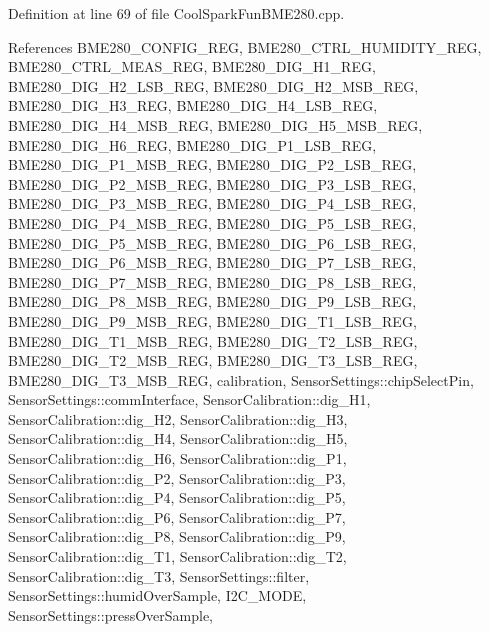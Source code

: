 Definition at line 69 of file Cool\+Spark\+Fun\+B\+M\+E280.\+cpp.



References B\+M\+E280\+\_\+\+C\+O\+N\+F\+I\+G\+\_\+\+R\+EG, B\+M\+E280\+\_\+\+C\+T\+R\+L\+\_\+\+H\+U\+M\+I\+D\+I\+T\+Y\+\_\+\+R\+EG, B\+M\+E280\+\_\+\+C\+T\+R\+L\+\_\+\+M\+E\+A\+S\+\_\+\+R\+EG, B\+M\+E280\+\_\+\+D\+I\+G\+\_\+\+H1\+\_\+\+R\+EG, B\+M\+E280\+\_\+\+D\+I\+G\+\_\+\+H2\+\_\+\+L\+S\+B\+\_\+\+R\+EG, B\+M\+E280\+\_\+\+D\+I\+G\+\_\+\+H2\+\_\+\+M\+S\+B\+\_\+\+R\+EG, B\+M\+E280\+\_\+\+D\+I\+G\+\_\+\+H3\+\_\+\+R\+EG, B\+M\+E280\+\_\+\+D\+I\+G\+\_\+\+H4\+\_\+\+L\+S\+B\+\_\+\+R\+EG, B\+M\+E280\+\_\+\+D\+I\+G\+\_\+\+H4\+\_\+\+M\+S\+B\+\_\+\+R\+EG, B\+M\+E280\+\_\+\+D\+I\+G\+\_\+\+H5\+\_\+\+M\+S\+B\+\_\+\+R\+EG, B\+M\+E280\+\_\+\+D\+I\+G\+\_\+\+H6\+\_\+\+R\+EG, B\+M\+E280\+\_\+\+D\+I\+G\+\_\+\+P1\+\_\+\+L\+S\+B\+\_\+\+R\+EG, B\+M\+E280\+\_\+\+D\+I\+G\+\_\+\+P1\+\_\+\+M\+S\+B\+\_\+\+R\+EG, B\+M\+E280\+\_\+\+D\+I\+G\+\_\+\+P2\+\_\+\+L\+S\+B\+\_\+\+R\+EG, B\+M\+E280\+\_\+\+D\+I\+G\+\_\+\+P2\+\_\+\+M\+S\+B\+\_\+\+R\+EG, B\+M\+E280\+\_\+\+D\+I\+G\+\_\+\+P3\+\_\+\+L\+S\+B\+\_\+\+R\+EG, B\+M\+E280\+\_\+\+D\+I\+G\+\_\+\+P3\+\_\+\+M\+S\+B\+\_\+\+R\+EG, B\+M\+E280\+\_\+\+D\+I\+G\+\_\+\+P4\+\_\+\+L\+S\+B\+\_\+\+R\+EG, B\+M\+E280\+\_\+\+D\+I\+G\+\_\+\+P4\+\_\+\+M\+S\+B\+\_\+\+R\+EG, B\+M\+E280\+\_\+\+D\+I\+G\+\_\+\+P5\+\_\+\+L\+S\+B\+\_\+\+R\+EG, B\+M\+E280\+\_\+\+D\+I\+G\+\_\+\+P5\+\_\+\+M\+S\+B\+\_\+\+R\+EG, B\+M\+E280\+\_\+\+D\+I\+G\+\_\+\+P6\+\_\+\+L\+S\+B\+\_\+\+R\+EG, B\+M\+E280\+\_\+\+D\+I\+G\+\_\+\+P6\+\_\+\+M\+S\+B\+\_\+\+R\+EG, B\+M\+E280\+\_\+\+D\+I\+G\+\_\+\+P7\+\_\+\+L\+S\+B\+\_\+\+R\+EG, B\+M\+E280\+\_\+\+D\+I\+G\+\_\+\+P7\+\_\+\+M\+S\+B\+\_\+\+R\+EG, B\+M\+E280\+\_\+\+D\+I\+G\+\_\+\+P8\+\_\+\+L\+S\+B\+\_\+\+R\+EG, B\+M\+E280\+\_\+\+D\+I\+G\+\_\+\+P8\+\_\+\+M\+S\+B\+\_\+\+R\+EG, B\+M\+E280\+\_\+\+D\+I\+G\+\_\+\+P9\+\_\+\+L\+S\+B\+\_\+\+R\+EG, B\+M\+E280\+\_\+\+D\+I\+G\+\_\+\+P9\+\_\+\+M\+S\+B\+\_\+\+R\+EG, B\+M\+E280\+\_\+\+D\+I\+G\+\_\+\+T1\+\_\+\+L\+S\+B\+\_\+\+R\+EG, B\+M\+E280\+\_\+\+D\+I\+G\+\_\+\+T1\+\_\+\+M\+S\+B\+\_\+\+R\+EG, B\+M\+E280\+\_\+\+D\+I\+G\+\_\+\+T2\+\_\+\+L\+S\+B\+\_\+\+R\+EG, B\+M\+E280\+\_\+\+D\+I\+G\+\_\+\+T2\+\_\+\+M\+S\+B\+\_\+\+R\+EG, B\+M\+E280\+\_\+\+D\+I\+G\+\_\+\+T3\+\_\+\+L\+S\+B\+\_\+\+R\+EG, B\+M\+E280\+\_\+\+D\+I\+G\+\_\+\+T3\+\_\+\+M\+S\+B\+\_\+\+R\+EG, calibration, Sensor\+Settings\+::chip\+Select\+Pin, Sensor\+Settings\+::comm\+Interface, Sensor\+Calibration\+::dig\+\_\+\+H1, Sensor\+Calibration\+::dig\+\_\+\+H2, Sensor\+Calibration\+::dig\+\_\+\+H3, Sensor\+Calibration\+::dig\+\_\+\+H4, Sensor\+Calibration\+::dig\+\_\+\+H5, Sensor\+Calibration\+::dig\+\_\+\+H6, Sensor\+Calibration\+::dig\+\_\+\+P1, Sensor\+Calibration\+::dig\+\_\+\+P2, Sensor\+Calibration\+::dig\+\_\+\+P3, Sensor\+Calibration\+::dig\+\_\+\+P4, Sensor\+Calibration\+::dig\+\_\+\+P5, Sensor\+Calibration\+::dig\+\_\+\+P6, Sensor\+Calibration\+::dig\+\_\+\+P7, Sensor\+Calibration\+::dig\+\_\+\+P8, Sensor\+Calibration\+::dig\+\_\+\+P9, Sensor\+Calibration\+::dig\+\_\+\+T1, Sensor\+Calibration\+::dig\+\_\+\+T2, Sensor\+Calibration\+::dig\+\_\+\+T3, Sensor\+Settings\+::filter, Sensor\+Settings\+::humid\+Over\+Sample, I2\+C\+\_\+\+M\+O\+DE, Sensor\+Settings\+::press\+Over\+Sample, 